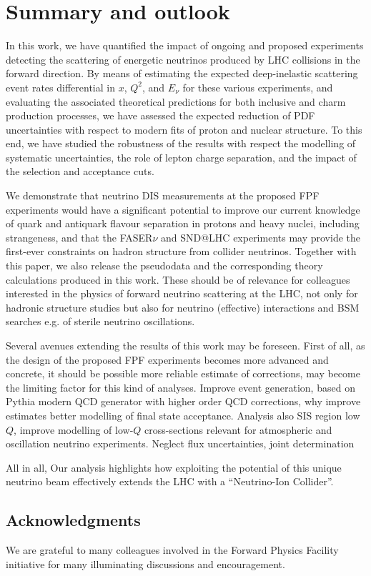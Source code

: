 \clearpage
\section{Summary and outlook}
\label{sec:summary}

In this work, we have quantified the impact of ongoing and proposed
experiments detecting the scattering of energetic neutrinos produced
by LHC collisions in the forward direction.
%
By means of estimating the expected deep-inelastic scattering
event rates differential
in $x$, $Q^2$, and $E_\nu$ for these various experiments, and
evaluating the associated theoretical predictions for
both inclusive and charm production processes, we have
assessed the expected reduction of PDF uncertainties with respect
to modern fits of proton and nuclear structure.
%
To this end, we have studied the robustness of the results
with respect the modelling of systematic uncertainties, the role of lepton
charge separation, and the impact of the selection and acceptance cuts.

We demonstrate that neutrino DIS measurements at the proposed FPF
experiments would have a significant potential to improve our current
knowledge of quark and antiquark flavour separation in protons
and heavy nuclei, including strangeness,
and that the FASER$\nu$ and SND@LHC
experiments may provide the first-ever
constraints on hadron structure from collider neutrinos.
%
Together with this paper, we also
release the pseudodata and the corresponding theory
calculations produced in this work.
%
These should be of relevance for colleagues interested in the physics
of forward
neutrino scattering at the LHC, not only for hadronic structure studies
but also for neutrino (effective)
interactions and BSM searches e.g. of sterile neutrino oscillations.

Several avenues extending the results of this work may be foreseen.
%
First of all, as the design of the proposed FPF experiments
becomes more advanced and concrete, it should be possible more reliable
estimate of corrections, may become the limiting factor
for this kind of analyses.
%
Improve event generation, based on {\sc\small Pythia}
modern QCD generator with higher order QCD corrections,
why improve estimates better modelling of final state acceptance.
%
Analysis also SIS region low $Q$, improve modelling of low-$Q$ cross-sections
relevant for atmospheric and oscillation neutrino experiments.
%
Neglect flux uncertainties, joint determination

All in all, Our analysis highlights how exploiting the potential
 of this unique neutrino beam  effectively
extends the LHC with a ``Neutrino-Ion Collider''.



\subsection*{Acknowledgments}
%
We are grateful to many colleagues involved in the Forward
Physics Facility initiative for many illuminating
discussions and encouragement.
